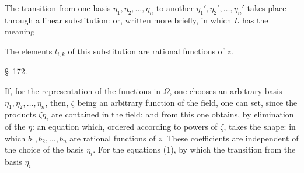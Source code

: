 The transition from one basis $\eta_1, \eta_2, \ldots, \eta_n$ to another $\eta_1', \eta_2', \ldots, \eta_n'$ takes place through a linear substitution:
or, written more briefly,
in which $L$ has the meaning

The elements $l_{i,k}$ of this substitution are rational functions of $z$.


\begin{center}
\S\ 172.

\end{center}

If, for the representation of the functions in $\Omega$, one chooses an arbitrary basis $\eta_1, \eta_2, \ldots, \eta_n$, then, $\zeta$ being an arbitrary function of the field, one can set, since the products $\zeta\eta_i$ are contained in the field:
and from this one obtains, by elimination of the $\eta$:
an equation which, ordered according to powers of $\zeta$, takes the shape:
in which $b_1, b_2, \ldots, b_n$ are rational functions of $z$. These coefficients are independent of the choice of the basis $\eta_i$. For the equations (1), by which the transition from the basis $\eta_i$
